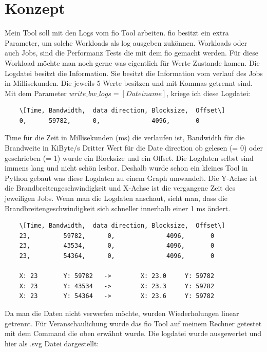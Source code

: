 \documentclass{article}
\begin{document}
\section{Konzept}
Mein Tool soll mit den Logs vom fio Tool arbeiten. \newline
fio besitzt ein extra Parameter, um solche Workloads als log ausgeben zukönnen.
Workloads oder auch Jobs, sind die Performanz Tests die mit dem fio gemacht werden.
Für diese Workload möchte man noch gerne was eigentlich für Werte Zustande kamen.
Die Logdatei besitzt die Information. Sie besitzt die Information vom verlauf des Jobs in Millisekunden.
Die jeweils 5 Werte besitzen und mit Kommas getrennt sind.
Mit dem Parameter $write\_bw\_logs=[Dateiname]$, kriege ich diese Logdatei:
\begin{lstlisting}
    \[Time,	Bandwidth,	data direction, Blocksize,	Offset\]
    0, 	    59782, 		0,		        4096,		0
\end{lstlisting}
Time für die Zeit in Millisekunden (ms) die verlaufen ist, Bandwidth für die Brandweite in KiByte/s
Dritter Wert für die Date direction ob gelesen (= 0) oder geschrieben (= 1) wurde ein Blocksize
und ein Offset. Die Logdaten selbst sind immens lang und nicht schön lesbar. Deshalb wurde schon ein kleines Tool in Python gebaut 
was diese Logdaten zu einem Graph umwandelt. 
Die Y-Achse ist die Brandbreitengeschwindigkeit und X-Achse ist die vergangene Zeit des jeweiligen Jobs.
Wenn man die Logdaten anschaut, sieht man, dass die Brandbreitengeschwindigkeit sich schneller innerhalb einer 1 ms ändert.
\newpage
\begin{lstlisting}
    \[Time,	Bandwidth,	data direction, Blocksize,	Offset\]
    23, 	    59782, 		0,		        4096,		0
    23, 	    43534, 		0,		        4096,		0
    23, 	    54364, 		0,		        4096,		0

    X: 23       Y: 59782   ->        X: 23.0     Y: 59782
    X: 23       Y: 43534   ->        X: 23.3     Y: 59782
    X: 23       Y: 54364   ->        X: 23.6     Y: 59782
\end{lstlisting}
Da man die Daten nicht verwerfen möchte, wurden Wiederholungen linear getrennt. 
Für Veranschaulichung wurde das fio Tool auf meinem Rechner getestet mit dem
Command die oben erwähnt wurde. Die logdatei wurde ausgewertet und hier als .svg Datei dargestellt:
\end{document}
